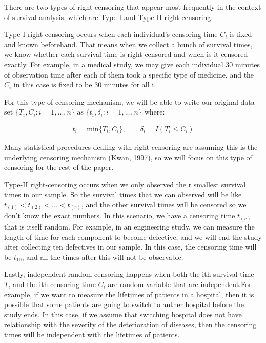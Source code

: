\documentclass[]{article}
\begin{document}
There are two types of right-censoring that appear most frequently in
the context of survival analysis, which are Type-I and Type-II
right-censoring.

Type-I right-censoring occurs when each individual's censoring time
\(C_i\) is fixed and known beforehand. That means when we collect a
bunch of survival times, we know whether each survival time is
right-censored and when is it censored exactly. For example, in a
medical study, we may give each individual 30 minutes of observation
time after each of them took a specific type of medicine, and the
\(C_i\) in this case is fixed to be 30 minutes for all i.

For this type of censoring mechanism, we will be able to write our
original data-set \(\{ T_i,C_i:i=1,...,n \}\) as
\(\{ t_i,\delta_i:i=1,...,n \}\) where:

\begin{equation}\begin{aligned}\label{eqn:transformed data}
t_i = \text{min}\{T_i,C_i \},  \qquad  \delta_i = I(T_i \leq C_i)
\end{aligned}\end{equation}

Many statistical procedures dealing with right censoring are assuming
this is the underlying censoring mechanism (Kwan, 1997), so we will
focus on this type of censoring for the rest of the paper.

Type-II right-censoring occurs when we only observed the r smallest
survival times in our sample. So the survival times that we can observed
will be like \(t_{(1)}<t_{(2)}<...<t_{(r)}\), and the other survival
times will be censored so we don't know the exact numbers. In this
scenario, we have a censoring time \(t_{(r)}\) that is itself random.
For example, in an engineering study, we can measure the length of time
for each component to become defective, and we will end the study after
collecting ten defectives in our sample. In this case, the censoring
time will be \(t_{10}\), and all the times after this will not be
observable.

Lastly, independent random censoring happens when both the ith survival
time \(T_i\) and the ith censoring time \(C_i\) are random variable that
are independent.For example, if we want to measure the lifetimes of
patients in a hospital, then it is possible that some patients are going
to switch to anther hospital before the study ends. In this case, if we
assume that switching hospital does not have relationship with the
severity of the deterioration of diseases, then the censoring times will
be independent with the lifetimes of patients.
\end{document}
